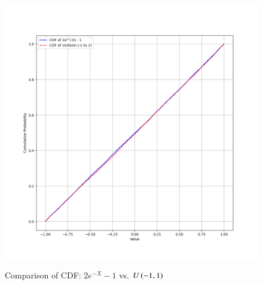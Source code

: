 \documentclass[book,11pt]{IEEEtran}
\begin{document}
\begin{figure}[H]
	\centering
	\includegraphics[width=\columnwidth]{figs/cdf_comp_3.png}
	\label{fig:i_2023/st/53_3}
	\caption{Comparison of CDF: $2e^{-X}-1$ vs. $U\left(-1,1\right)$}
\end{figure}
\end{document}
